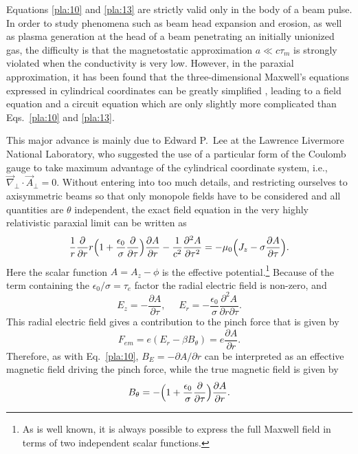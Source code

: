 \documentclass [12pt,a4paper,     ]{report} %
\begin{document}
  Equations \eqref{pla:10} and \eqref{pla:13} are strictly valid only in the body of a beam pulse.  In order to study phenomena such as beam head expansion and erosion, as well as plasma generation at the head of a beam penetrating an initially unionized gas, the difficulty is that the magnetostatic approximation $a \ll c\tau_m$ is strongly violated when the conductivity is very low.  However, in the paraxial approximation, it has been found that the three-dimensional Maxwell's equations expressed in cylindrical coordinates can  be greatly simplified \cite{CHAMB1979A, CHAMB1981-, HUI--1984A, KRALL1989B}, leading to a field equation and a circuit equation which are only slightly more complicated than Eqs.~\eqref{pla:10} and \eqref{pla:13}.

  This major advance is mainly due to Edward P.~Lee at the Lawrence Livermore National Laboratory, who suggested the use of a particular form of the Coulomb gauge \cite[Sec.6.5]{JACKS1975-} to take maximum advantage of the cylindrical coordinate system, i.e., $\vec{\nabla}_{\perp} \cdot \vec{A}_{\perp} = 0$.  Without entering into too much details, and restricting ourselves to axisymmetric beams so that only monopole fields have to be considered and all quantities are $\theta$ independent, the exact field equation in the very highly relativistic paraxial limit can be written as \cite{CHAMB1979A}
%
\begin{equation}\label{pla:15} %
        \frac{1}{r} \frac{\partial    }{\partial r} r
     \Bigl(1+ \frac{\epsilon_0}{\sigma} \frac{\partial }{\partial \tau} \Bigr) 
          \frac{\partial   A}{\partial r}
     - \frac{1}{c^2}\frac{\partial^2 A}{\partial \tau^2}
     = - \mu_0 \Bigl( J_z - \sigma \frac{\partial A}{\partial \tau} \Bigr).
\end{equation}
%
Here the scalar function $A=A_z - \phi$ is the effective potential.\footnote{As is well known, it is always possible to express the full Maxwell field in terms of two independent scalar functions.}  Because of the term containing the $\epsilon_0/\sigma=\tau_e$ factor the radial electric field is non-zero, and
%
\begin{equation}\label{pla:16} %
 E_z = -\frac{\partial A}{\partial \tau},  ~~~  ~~~
 E_r = -\frac{\epsilon_0}{\sigma} \frac{\partial^2 A}{\partial r \partial \tau}.
\end{equation}
%
This radial electric field gives a contribution to the pinch force that is given by
%
\begin{equation}\label{pla:17} %
  F_{em} = e (E_r - \beta B_\theta) = e \frac{\partial A}{\partial r}.
\end{equation}
%
Therefore, as with Eq.~\eqref{pla:10}, $B_E = -{\partial A}/{\partial r}$ can be interpreted as an effective magnetic field driving the pinch force, while the true magnetic field is given by
%
\begin{equation}\label{pla:18} %
 B_\theta = - \Bigl(1+ \frac{\epsilon_0}{\sigma}
                       \frac{\partial }{\partial \tau} \Bigr) 
                       \frac{\partial   A}{\partial r}.
\end{equation}
%
\end{document}
